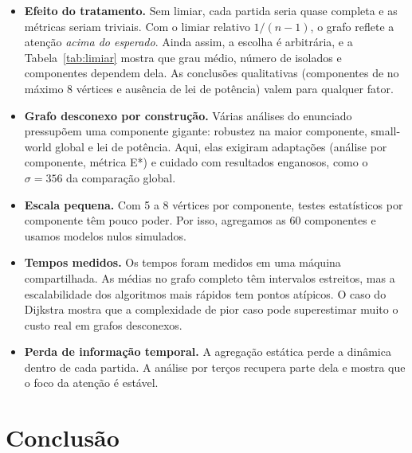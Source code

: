 \documentclass[sigconf]{acmart}
\begin{document}
\begin{itemize}
  \item \textbf{Efeito do tratamento.} Sem limiar, cada partida seria quase completa e as métricas
  seriam triviais. Com o limiar relativo $1/(n-1)$, o grafo reflete a atenção \emph{acima do esperado}.
  Ainda assim, a escolha é arbitrária, e a Tabela~\ref{tab:limiar} mostra que grau médio, número de
  isolados e componentes dependem dela. As conclusões qualitativas (componentes de no máximo 8
  vértices e ausência de lei de potência) valem para qualquer fator.
  \item \textbf{Grafo desconexo por construção.} Várias análises do enunciado pressupõem uma componente
  gigante: robustez na maior componente, small-world global e lei de potência. Aqui, elas exigiram
  adaptações (análise por componente, métrica E*) e cuidado com resultados enganosos, como o
  $\sigma = 356$ da comparação global.
  \item \textbf{Escala pequena.} Com 5 a 8 vértices por componente, testes estatísticos por componente
  têm pouco poder. Por isso, agregamos as 60 componentes e usamos modelos nulos simulados.
  \item \textbf{Tempos medidos.} Os tempos foram medidos em uma máquina compartilhada. As médias no
  grafo completo têm intervalos estreitos, mas a escalabilidade dos algoritmos mais rápidos tem pontos
  atípicos. O caso do Dijkstra mostra que a complexidade de pior caso pode superestimar muito o custo
  real em grafos desconexos.
  \item \textbf{Perda de informação temporal.} A agregação estática perde a dinâmica dentro de cada
  partida. A análise por terços recupera parte dela e mostra que o foco da atenção é estável.
\end{itemize}

\section{Conclusão}
\end{document}
